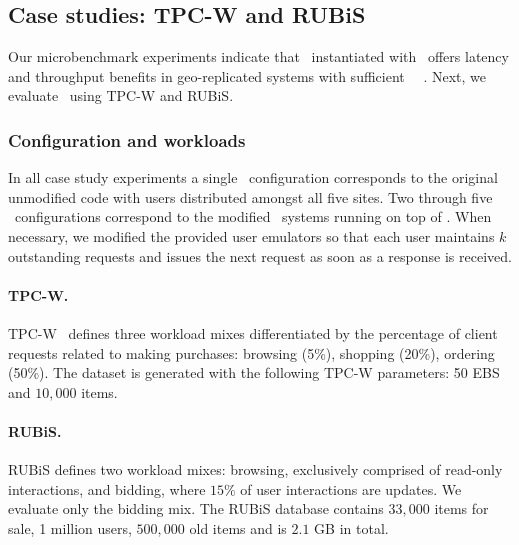\subsection{Case studies:  TPC-W and RUBiS}
Our microbenchmark experiments indicate that \RBc\ instantiated with
\gemini\ offers latency and throughput benefits in geo-replicated
systems with sufficient \blue\ \shadow\ \operations. Next, we evaluate \gemini\ using TPC-W and RUBiS.

\subsubsection{Configuration and  workloads}
In all case study experiments a single \dc\ configuration
corresponds to the original unmodified code with users distributed
amongst all five sites.  Two through five \dc\ configurations
correspond to the modified \RBct\ systems running on top of \gemini.
When necessary, we modified the provided user emulators so that each
user maintains $k$ outstanding requests and issues the next request as
soon as a response is received.

\paragraph{TPC-W.}
TPC-W~\cite{TPC-Wv18} defines three workload mixes
differentiated by the percentage of client requests related to making
purchases: browsing (5\%), shopping (20\%), ordering (50\%). The
dataset is generated with the following TPC-W
parameters: 50 EBS and $10,000$ items.  


\paragraph{RUBiS.}
RUBiS defines two workload mixes: browsing, exclusively comprised of
read-only interactions, and bidding, where $15\%$ of user
interactions are updates. We evaluate only the bidding mix. The RUBiS
database contains $33,000$ items for sale, 1 million users, $500,000$
old items and is $2.1$ GB in total.


